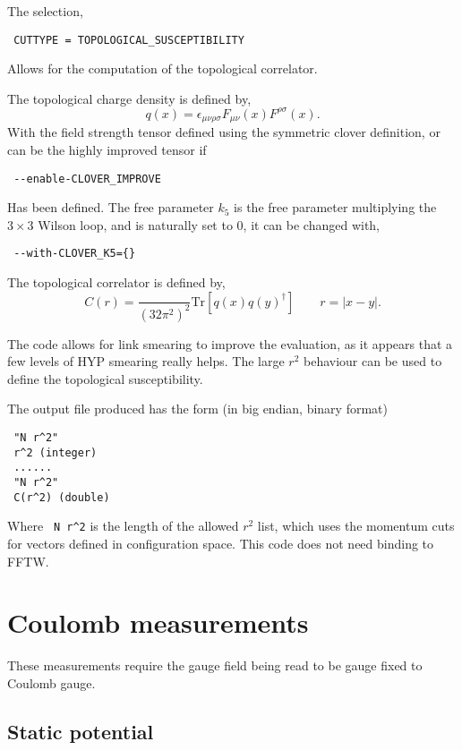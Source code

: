\documentclass[12pt]{article}
\begin{document}
The selection,
\begin{verbatim}
 CUTTYPE = TOPOLOGICAL_SUSCEPTIBILITY
\end{verbatim}
Allows for the computation of the topological correlator.

The topological charge density is defined by,
\begin{equation}
 q(x) = \epsilon_{\mu\nu\rho\sigma} F_{\mu\nu}(x) F^{\rho\sigma}(x).
\end{equation}
With the field strength tensor defined using the symmetric clover definition, or can be the highly improved tensor if
\begin{verbatim}
 --enable-CLOVER_IMPROVE
\end{verbatim}
Has been defined. The free parameter $k_5$ is the free parameter multiplying the $3\times3$ Wilson loop, and is naturally set to 0, it can be changed with,
\begin{verbatim}
 --with-CLOVER_K5={}
\end{verbatim}

The topological correlator is defined by,
\begin{equation}
 C(r) = \frac{}{(32\pi^2)^2}\text{Tr}\left[ q(x) q(y)^{\dagger} \right]\qquad r=|x-y|.
\end{equation}

The code allows for link smearing to improve the evaluation, as it appears that a few levels of HYP smearing really helps. The large $r^2$ behaviour can be used to define the topological susceptibility.

The output file produced has the form (in big endian, binary format)
\begin{verbatim}
 "N r^2"
 r^2 (integer)
 ......
 "N r^2"
 C(r^2) (double)
\end{verbatim}
Where \verb| N r^2| is the length of the allowed $r^2$ list, which uses the momentum cuts for vectors defined in configuration space. This code does not need binding to FFTW.

\section{Coulomb measurements}

These measurements require the gauge field being read to be gauge fixed to Coulomb gauge.

\subsection{Static potential}
\end{document}
